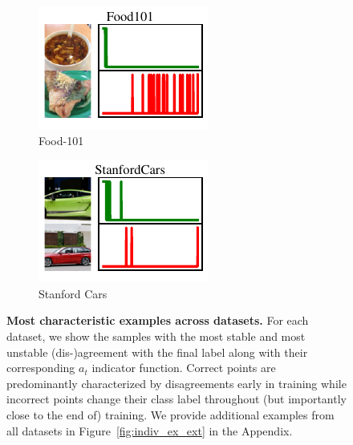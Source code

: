 \begin{figure}[t]
\begin{subfigure}[b]{0.23\linewidth}
  \includegraphics[width=\linewidth]{figs/sptd/food_points.pdf}
  \caption{Food-101}
\end{subfigure}
\hfill
\begin{subfigure}[b]{0.23\linewidth}
  \centering
  \includegraphics[width=\linewidth]{figs/sptd/cars_points.pdf}
  \caption{Stanford Cars}
\end{subfigure}

\caption[\textbf{Most characteristic examples across datasets.}]{\textbf{Most characteristic examples across datasets.} For each dataset, we show the samples with the most stable and most unstable (dis-)agreement with the final label along with their corresponding $a_t$ indicator function. Correct points are predominantly characterized by disagreements early in training while incorrect points change their class label throughout (but importantly close to the end of) training. We provide additional examples from all datasets in Figure~\ref{fig:indiv_ex_ext} in the Appendix.}
\label{fig:indiv_ex}
\end{figure}


